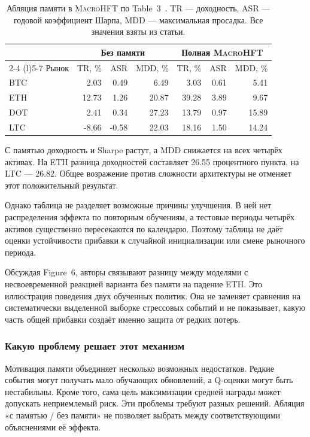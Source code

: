 \documentclass[9pt,a4paper,twocolumn]{extarticle}
\newcommand{\Macro}{\textsc{MacroHFT}}
\begin{document}
\begin{table}[t]
  \centering
  \caption{Абляция памяти в \Macro{} по Table~3~\cite{zong2024macrohft}.
  TR --- доходность, ASR --- годовой коэффициент Шарпа, MDD --- максимальная просадка.
  Все значения взяты из статьи.}
  \label{tab:memory_ablation}
  \footnotesize
  \renewcommand{\arraystretch}{1.15}
  \begin{tabular}{@{}lrrrrrr@{}}
    \toprule
    & \multicolumn{3}{c}{Без памяти}
    & \multicolumn{3}{c}{Полная \Macro{}}\\
    \cmidrule(lr){2-4}
    \cmidrule(l){5-7}
    Рынок
    & TR, \% & ASR & MDD, \%
    & TR, \% & ASR & MDD, \%\\
    \midrule
    BTC &  2.03 &  0.49 &  6.49
        &  3.03 &  0.61 &  5.41\\
    ETH & 12.73 &  1.26 & 20.87
        & 39.28 &  3.89 &  9.67\\
    DOT &  2.41 &  0.34 & 27.23
        & 13.79 &  0.97 & 15.89\\
    LTC & -8.66 & -0.58 & 22.03
        & 18.16 &  1.50 & 14.24\\
    \bottomrule
  \end{tabular}
\end{table}

С памятью доходность и Sharpe растут, а MDD снижается на всех четырёх активах. На ETH разница
доходностей составляет 26.55 процентного пункта, на LTC --- 26.82. Общее возражение против
сложности архитектуры не отменяет этот положительный результат.

Однако таблица не разделяет возможные причины улучшения. В ней нет распределения эффекта по
повторным обучениям, а тестовые периоды четырёх активов существенно пересекаются по календарю.
Поэтому таблица не даёт оценки устойчивости прибавки к случайной инициализации или смене
рыночного периода.

Обсуждая Figure~6, авторы связывают разницу между моделями с несвоевременной реакцией варианта
без памяти на падение ETH. Это иллюстрация поведения двух обученных политик. Она не заменяет
сравнения на систематически выделенной выборке стрессовых событий и не показывает, какую часть
общей прибавки создаёт именно защита от редких потерь.

\subsubsection{Какую проблему решает этот механизм}

Мотивация памяти объединяет несколько возможных недостатков. Редкие события могут получать мало
обучающих обновлений, а Q-оценки могут быть нестабильны. Кроме того, сама цель максимизации
средней награды может допускать неприемлемый риск. Эти проблемы требуют разных решений. Абляция
«с памятью / без памяти» не позволяет выбрать между соответствующими объяснениями её эффекта.
\end{document}
